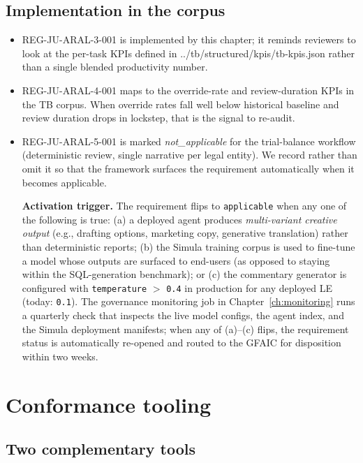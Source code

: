 \documentclass[11pt,a4paper,twoside]{report}
\newcommand{\corpus}{}
\begin{document}
\section{Implementation in the corpus}

\begin{itemize}
\item REG-JU-ARAL-3-001 is implemented by this chapter; it reminds
reviewers to look at the per-task KPIs defined in
\corpus{../tb/structured/kpis/tb-kpis.json} rather than a single
blended productivity number.
\item REG-JU-ARAL-4-001 maps to the override-rate and review-duration
KPIs in the TB corpus. When override rates fall well below
historical baseline and review duration drops in lockstep, that
is the signal to re-audit.
\item REG-JU-ARAL-5-001 is marked \emph{not\_applicable} for the
trial-balance workflow (deterministic review, single narrative
per legal entity). We record rather than omit it so that the
framework surfaces the requirement automatically when it
becomes applicable.

\textbf{Activation trigger.} The requirement flips to
\texttt{applicable} when any one of the following is true:
(a) a deployed agent produces \emph{multi-variant creative
output} (e.g., drafting options, marketing copy, generative
translation) rather than deterministic reports; (b) the
Simula training corpus is used to fine-tune a model whose
outputs are surfaced to end-users (as opposed to staying
within the SQL-generation benchmark); or (c) the
commentary generator is configured with
\texttt{temperature} $>$ \texttt{0.4} in production for any
deployed LE (today: \texttt{0.1}). The governance
monitoring job in Chapter~\ref{ch:monitoring} runs a
quarterly check that inspects the live model configs, the
agent index, and the Simula deployment manifests; when any
of (a)--(c) flips, the requirement status is automatically
re-opened and routed to the GFAIC for disposition within
two weeks.
\end{itemize}
\clearpage
\chapter{Conformance tooling}
\label{ch:tooling}

\section{Two complementary tools}
\end{document}
